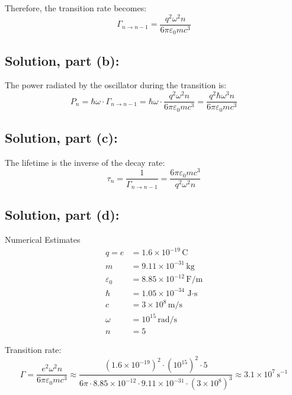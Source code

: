 \documentclass[12pt]{article}
\begin{document}
        Therefore, the transition rate becomes:
        \[
            \boxed{
            \Gamma_{n \to n-1} = \frac{q^2 \omega^2 n}{6\pi \varepsilon_0 m c^3}
            }
        \]

    \subsection{Solution, part (b):}
        The power radiated by the oscillator during the transition is:
        \[
            P_n = \hbar \omega \cdot \Gamma_{n \to n-1}
            = \hbar \omega \cdot \frac{q^2 \omega^2 n}{6\pi \varepsilon_0 m c^3}
            = \boxed{
            \frac{q^2 \hbar \omega^3 n}{6\pi \varepsilon_0 m c^3}}
        \]

    \subsection{Solution, part (c):}
        The lifetime is the inverse of the decay rate:
        \[
            \tau_n = \frac{1}{\Gamma_{n \to n-1}} 
            = \boxed{
            \frac{6\pi \varepsilon_0 m c^3}{q^2 \omega^2 n}}
        \]

    \subsection{Solution, part (d):}
        Numerical Estimates
        \vspace{0.5em}
        \noindent
        \begin{align*}
            q = e &= 1.6 \times 10^{-19} \, \text{C} \\
            m &= 9.11 \times 10^{-31} \, \text{kg} \\
            \varepsilon_0 &= 8.85 \times 10^{-12} \, \text{F/m} \\
            \hbar &= 1.05 \times 10^{-34} \, \text{J$\cdot$s} \\
            c &= 3 \times 10^8 \, \text{m/s} \\
            \omega &= 10^{15} \, \text{rad/s} \\
            n &= 5
        \end{align*}
        
        \vspace{0.5em}
        \noindent
        Transition rate:
        \[
            \Gamma = \frac{e^2 \omega^2 n}{6\pi \varepsilon_0 m c^3}
            \approx \frac{(1.6 \times 10^{-19})^2 \cdot (10^{15})^2 \cdot 5}{6\pi \cdot 8.85 \times 10^{-12} \cdot 9.11 \times 10^{-31} \cdot (3 \times 10^8)^3}
            \approx \boxed{3.1 \times 10^7 \, \text{s}^{-1}}
        \]
        
\end{document}
